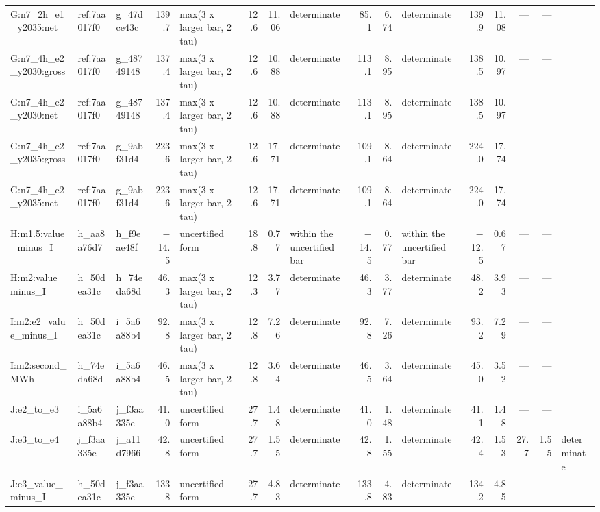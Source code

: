 \begin{table}[htbp]
\begin{tabular}{lllrlrrlrrlrrrrl}
G:n7\_2h\_e1\_y2035:net & ref:7aa017f0 & g\_47dce43c & 139.7 & max(3 x larger bar, 2 tau) & 12.6 & 11.06 & determinate & 85.1 & 6.74 & determinate & 139.9 & 11.08 & --- & --- &  \\
G:n7\_4h\_e2\_y2030:gross & ref:7aa017f0 & g\_48749148 & 137.4 & max(3 x larger bar, 2 tau) & 12.6 & 10.88 & determinate & 113.1 & 8.95 & determinate & 138.5 & 10.97 & --- & --- &  \\
G:n7\_4h\_e2\_y2030:net & ref:7aa017f0 & g\_48749148 & 137.4 & max(3 x larger bar, 2 tau) & 12.6 & 10.88 & determinate & 113.1 & 8.95 & determinate & 138.5 & 10.97 & --- & --- &  \\
G:n7\_4h\_e2\_y2035:gross & ref:7aa017f0 & g\_9abf31d4 & 223.6 & max(3 x larger bar, 2 tau) & 12.6 & 17.71 & determinate & 109.1 & 8.64 & determinate & 224.0 & 17.74 & --- & --- &  \\
G:n7\_4h\_e2\_y2035:net & ref:7aa017f0 & g\_9abf31d4 & 223.6 & max(3 x larger bar, 2 tau) & 12.6 & 17.71 & determinate & 109.1 & 8.64 & determinate & 224.0 & 17.74 & --- & --- &  \\
H:m1.5:value\_minus\_I & h\_aa8a76d7 & h\_f9eae48f & $-$14.5 & uncertified form & 18.8 & 0.77 & within the uncertified bar & $-$14.5 & 0.77 & within the uncertified bar & $-$12.5 & 0.67 & --- & --- &  \\
H:m2:value\_minus\_I & h\_50dea31c & h\_74eda68d & 46.3 & max(3 x larger bar, 2 tau) & 12.3 & 3.77 & determinate & 46.3 & 3.77 & determinate & 48.2 & 3.93 & --- & --- &  \\
I:m2:e2\_value\_minus\_I & h\_50dea31c & i\_5a6a88b4 & 92.8 & max(3 x larger bar, 2 tau) & 12.8 & 7.26 & determinate & 92.8 & 7.26 & determinate & 93.2 & 7.29 & --- & --- &  \\
I:m2:second\_MWh & h\_74eda68d & i\_5a6a88b4 & 46.5 & max(3 x larger bar, 2 tau) & 12.8 & 3.64 & determinate & 46.5 & 3.64 & determinate & 45.0 & 3.52 & --- & --- &  \\
J:e2\_to\_e3 & i\_5a6a88b4 & j\_f3aa335e & 41.0 & uncertified form & 27.7 & 1.48 & determinate & 41.0 & 1.48 & determinate & 41.1 & 1.48 & --- & --- &  \\
J:e3\_to\_e4 & j\_f3aa335e & j\_a11d7966 & 42.8 & uncertified form & 27.7 & 1.55 & determinate & 42.8 & 1.55 & determinate & 42.4 & 1.53 & 27.7 & 1.55 & determinate \\
J:e3\_value\_minus\_I & h\_50dea31c & j\_f3aa335e & 133.8 & uncertified form & 27.7 & 4.83 & determinate & 133.8 & 4.83 & determinate & 134.2 & 4.85 & --- & --- &  \\

\end{tabular}
\end{table}

